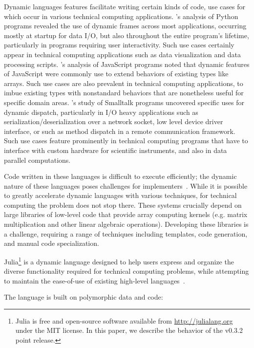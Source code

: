 \documentclass[10pt, preprint]{sigplanconf}
\begin{document}
Dynamic languages features facilitate writing certain kinds of code, use cases
for which occur in various technical computing applications.
\cite{Holkner2009}'s analysis of Python programs revealed the use of dynamic
frames across most applications, occurring mostly at startup for data I/O, but
also throughout the entire program's lifetime, particularly in programs
requiring user interactivity. Such use cases certainly appear in technical
computing applications such as data visualization and data processing scripts.
\cite{Richards2010}'s analysis of JavaScript programs noted that dynamic
features of JavaScript were commonly use to extend behaviors of existing types
like arrays. Such use cases are also prevalent in technical computing
applications, to imbue existing types with nonstandard behaviors that are
nonetheless useful for specific domain areas. \cite{Callau2012}'s study of
Smalltalk programs uncovered specific uses for dynamic dispatch, particularly
in I/O heavy applications such as serialization/deserialization over a network
socket, low level device driver interface, or such as method dispatch in a
remote communication framework. Such use cases feature prominently in
technical computing programs that have to interface with custom hardware for
scientific instruments, and also in data parallel computations.

Code written in these languages is difficult to execute efficiently;
the dynamic nature of these languages poses challenges for
implementers~\cite{Joisha2001,Joisha2006,Seljebotn2009}. While it is possible
to greatly accelerate dynamic languages with various techniques, for
technical computing the problem does not stop there. These systems
crucially depend on large libraries of low-level code that provide array
computing kernels (e.g. matrix multiplication and other linear algebraic
operations). Developing these libraries is a challenge, requiring a range of
techniques including templates, code generation, and manual code
specialization.

Julia\footnote{Julia is free and open-source software available from
\url{http://julialang.org} under the MIT license. In this paper, we describe
the behavior of the v0.3.2 point release.} is a dynamic language designed to
help users express and organize the diverse functionality required for technical computing problems, while
attempting to maintain the ease-of-use of existing high-level
languages~\cite{Bezanson2012,Bezanson2014b}.

The language is built on polymorphic data and code:
\end{document}
